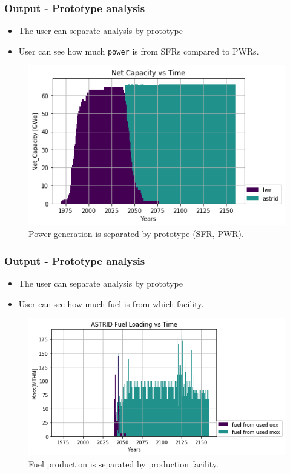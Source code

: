 \begin{frame}
    \frametitle{Output - Prototype analysis}
    \begin{itemize}
        \item The user can separate analysis by prototype
        \item User can see how much \texttt{power} is from SFRs compared to PWRs.
    \end{itemize}
    \begin{figure}[htbp!]
        \begin{center}
                \includegraphics[width=.8\textwidth]{./images/sim_output/power_plot.png}
        \end{center}
    \caption{Power generation is separated by prototype (SFR, PWR).}
    \end{figure}
\end{frame}


\begin{frame}
    \frametitle{Output - Prototype analysis}
    \begin{itemize}
        \item The user can separate analysis by prototype
        \item User can see how much fuel is from which facility.
    \end{itemize}
    \begin{figure}[htbp!]
        \begin{center}
                \includegraphics[width=.8\textwidth]{./images/sim_output/where_fuel.png}
        \end{center}
    \caption{Fuel production is separated by production facility.}
    \end{figure}
\end{frame}

